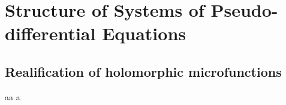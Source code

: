 \chapter{Structure of Systems of Pseudo-differential Equations}

\section{Realification of holomorphic microfunctions}

aa a
